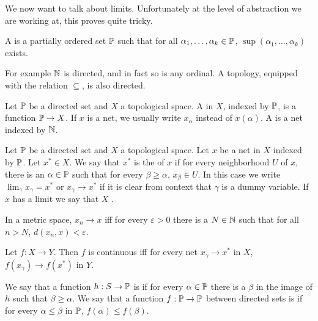 \begin{subsec}
We now want to talk about limits. Unfortunately at the level of abstraction we are working at, this proves quite tricky.
\end{subsec}

\begin{definition}
A  is a partially ordered set $\mathbb{P}$ such that for all $\alpha_1, \dots, \alpha_k \in \mathbb{P}$, $\sup(\alpha_1, \dots, \alpha_k)$ exists.
\end{definition}

\begin{subsec}
For example $\mathbb{N}$ is directed, and in fact so is any ordinal. A topology, equipped with the relation $\subseteq$, is also directed.
\end{subsec}

\begin{definition}
Let $\mathbb{P}$ be a directed set and $X$ a topological space.
A  in $X$, indexed by $\mathbb{P}$, is a function $\mathbb{P} \to X$. If $x$ is a net, we usually write $x_\alpha$ instead of $x(\alpha)$.
A  is a net indexed by $\mathbb{N}$.
\end{definition}

\begin{definition}
Let $\mathbb{P}$ be a directed set and $X$ a topological space. Let $x$ be a net in $X$ indexed by $\mathbb{P}$. Let $x^* \in X$.
We say that $x^*$ is the  of $x$ if for every neighborhood $U$ of $x$, there is an $\alpha \in \mathbb{P}$ such that for every $\beta \geq \alpha$, $x_\beta \in U$.
In this case we write $\lim_\gamma x_\gamma = x^*$ or $x_\gamma \to x^*$ if it is clear from context that $\gamma$ is a dummy variable.
If $x$ has a limit we say that $X$ .
\end{definition}

\begin{lemma}
In a metric space, $x_n \to x$ iff for every $\varepsilon > 0$ there is a $N \in \mathbb{N}$ such that for all $n > N$, $d(x_n, x) < \varepsilon$.
\end{lemma}

\begin{lemma}
Let $f: X \to Y$. Then $f$ is continuous iff for every net $x_\gamma \to x^*$ in $X$, $f(x_\gamma) \to f(x^*)$ in $Y$.
\end{lemma}

\begin{definition}
We say that a function $h: S \to \mathbb{P}$ is  if for every $\alpha \in \mathbb{P}$ there is a $\beta$ in the image of $h$ such that $\beta \geq \alpha$.
We say that a function $f: \mathbb{P} \to \mathbb{P}$ between directed sets is  if for every $\alpha \leq \beta$ in $\mathbb{P}$, $f(\alpha) \leq f(\beta)$.
\end{definition}

